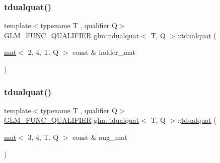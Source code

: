 \mbox{\label{structglm_1_1tdualquat_aaf58d434e56496978c027c3b7c021cfb}} 
\subsubsection{\texorpdfstring{tdualquat()}{tdualquat()}\hspace{0.1cm}{\footnotesize\ttfamily [8/11]}}
{\footnotesize\ttfamily template$<$typename T , qualifier Q$>$ \\
\hyperlink{setup_8hpp_a33fdea6f91c5f834105f7415e2a64407}{G\+L\+M\+\_\+\+F\+U\+N\+C\+\_\+\+Q\+U\+A\+L\+I\+F\+I\+ER} \hyperlink{structglm_1_1tdualquat}{glm\+::tdualquat}$<$ T, Q $>$\+::\hyperlink{structglm_1_1tdualquat}{tdualquat} (\begin{DoxyParamCaption}\item[{\hyperlink{structglm_1_1mat}{mat}$<$ 2, 4, T, Q $>$ const \&}]{holder\+\_\+mat }\end{DoxyParamCaption})}

\mbox{\label{structglm_1_1tdualquat_a3f557639a4737d4852919fdbbb39e133}} 
\subsubsection{\texorpdfstring{tdualquat()}{tdualquat()}\hspace{0.1cm}{\footnotesize\ttfamily [9/11]}}
{\footnotesize\ttfamily template$<$typename T , qualifier Q$>$ \\
\hyperlink{setup_8hpp_a33fdea6f91c5f834105f7415e2a64407}{G\+L\+M\+\_\+\+F\+U\+N\+C\+\_\+\+Q\+U\+A\+L\+I\+F\+I\+ER} \hyperlink{structglm_1_1tdualquat}{glm\+::tdualquat}$<$ T, Q $>$\+::\hyperlink{structglm_1_1tdualquat}{tdualquat} (\begin{DoxyParamCaption}\item[{\hyperlink{structglm_1_1mat}{mat}$<$ 3, 4, T, Q $>$ const \&}]{aug\+\_\+mat }\end{DoxyParamCaption})}

\mbox{\label{structglm_1_1tdualquat_a9dbf71289809c7b43527c0e881601fbb}} 
